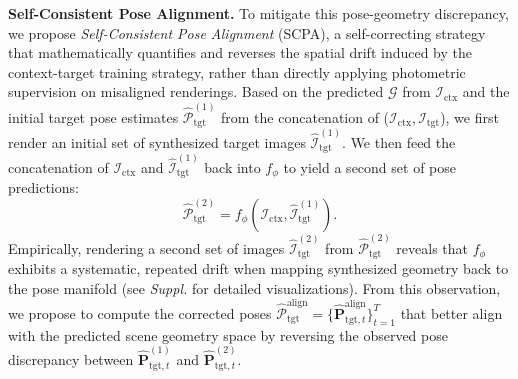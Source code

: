 

\noindent \textbf{Self-Consistent Pose Alignment.} 
To mitigate this pose-geometry discrepancy, we propose \textit{Self-Consistent Pose Alignment} (SCPA), a self-correcting strategy that mathematically quantifies and reverses the spatial drift induced by the context-target training strategy, rather than directly applying photometric supervision on misaligned renderings. 
Based on the predicted $\mathcal{G}$ from $\mathcal{I}_\text{ctx}$ and the initial target pose estimates $\hat{\mathcal{P}}^{(1)}_\text{tgt}$ from the concatenation of ($\mathcal{I}_\text{ctx}, \mathcal{I}_\text{tgt}$), we first render an initial set of synthesized target images $\hat{\mathcal{I}}^{(1)}_\text{tgt}$. We then feed the concatenation of $\mathcal{I}_\text{ctx}$ and $\hat{\mathcal{I}}^{(1)}_\text{tgt}$ back into $f_{\phi}$ to yield a second set of pose predictions:
\begin{equation}
    \hat{\mathcal{P}}^{(2)}_\text{tgt} = f_{\phi}(\mathcal{I}_\text{ctx}, \hat{\mathcal{I}}^{(1)}_\text{tgt}).
    \label{eq:recursive_pose}
\end{equation}
Empirically, rendering a second set of images $\hat{\mathcal{I}}^{(2)}_\text{tgt}$ from $\hat{\mathcal{P}}^{(2)}_\text{tgt}$ reveals that $f_{\phi}$ exhibits a systematic, repeated drift when mapping synthesized geometry back to the pose manifold (see \textit{Suppl.} for detailed visualizations). From this observation, we propose to compute the corrected poses $\hat{\mathcal{P}}^{\text{align}}_\text{tgt} = \{\hat{\bm{P}}^{\text{align}}_{\text{tgt},t}\}_{t=1}^T$ that better align with the predicted scene geometry space by reversing the observed pose discrepancy between $\hat{\bm{P}}^{(\text{1})}_{\text{tgt}, t}$ and $\hat{\bm{P}}^{(\text{2})}_{\text{tgt}, t}$.

